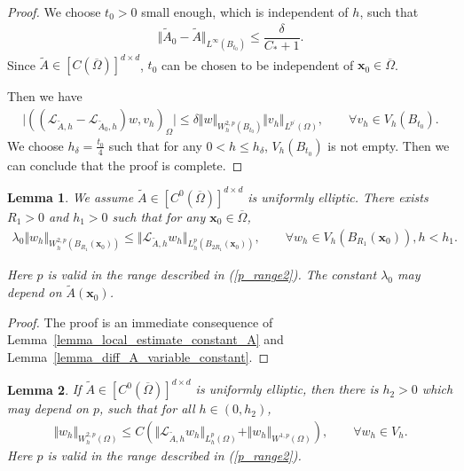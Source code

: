 \documentclass[12pt]{amsart}
\newcommand{\boldx}{\boldsymbol{x}}
\newtheorem{lemma}{Lemma}[section]
\theoremstyle{definition}
\theoremstyle{remark}
\begin{document}
\begin{proof}
We choose $t_{0}>0$ small enough, which is independent of $h$, such that 
\begin{align*}
\Vert \tilde{A}_{0} - \tilde{A} \Vert_{L^{\infty}(B_{t_{0}})} \leq \dfrac{\delta}{C_{*} + 1}.
\end{align*}
Since $\tilde{A}\in [C(\overline{\Omega})]^{d \times d}$, $t_{0}$ can be chosen to be independent 
of $\boldx_{0} \in \overline{\Omega}$.

Then we have 
\begin{align*}
\vert ((\mathcal{L}_{\tilde{A},h} - \mathcal{L}_{\tilde{A}_{0},h})w, v_{h})_{\Omega} \vert
\leq \delta \Vert w\Vert_{W_{h}^{2,p}(B_{t_{0}})} \Vert v_{h}\Vert_{L^{p^{\prime}}(\Omega)}, 
\qquad \forall v_{h} \in V_{h}(B_{t_{0}}).
\end{align*}
We choose $h_{\delta} = \frac{t_{0}}{4}$ such that for any $0<h\leq h_{\delta}$, $V_{h}(B_{t_{0}})$ is not empty. 
Then we can conclude that the proof is complete.
\end{proof}

\begin{lemma}
\label{lemma_local_estimate_variable_A}
We assume $\tilde{A} \in [C^{0}(\overline{\Omega})]^{d \times d}$ is uniformly elliptic.
There exists $R_{1} > 0$ and $h_{1} > 0$ such that for any $\boldx_{0} \in \overline{\Omega}$, 
\begin{align}
\label{local_estimate_variable_A}
\lambda_{0}\Vert w_{h}\Vert_{W_{h}^{2,p}(B_{R_{1}}(\boldx_{0}))} 
\leq \Vert \mathcal{L}_{\tilde{A},h}w_{h} \Vert_{L_{h}^{p}(B_{2R_{1}}(\boldx_{0}))}, 
\qquad \forall w_{h} \in V_{h}(B_{R_{1}}(\boldx_{0})), h < h_{1}.
\end{align}

Here $p$ is valid in the range described in (\ref{p_range2}).
The constant $\lambda_{0}$ may depend on $\tilde{A}(\boldx_{0})$.
\end{lemma}

\begin{proof}
The proof is an immediate consequence of Lemma~\ref{lemma_local_estimate_constant_A} 
and Lemma~\ref{lemma_diff_A_variable_constant}.
\end{proof}

\begin{lemma}
\label{lemma_gloabl_estimate_with_reaction}
If $\tilde{A} \in [C^{0}(\overline{\Omega})]^{d\times d}$ is uniformly elliptic, then 
there is $h_{2} > 0$ which may depend on $p$, such that for all $h \in (0, h_{2})$,
\begin{align}
\label{gloabl_estimate_with_reaction}
\Vert w_{h} \Vert_{W_{h}^{2,p}(\Omega)} \leq C \left( \Vert \mathcal{L}_{\tilde{A},h}w_{h}\Vert_{L_{h}^{p}(\Omega)} 
+ \Vert w_{h}\Vert_{W^{1,p}(\Omega)} \right), \qquad \forall w_{h} \in V_{h}.
\end{align}
Here $p$ is valid in the range described in (\ref{p_range2}).
\end{lemma}
\end{document}
